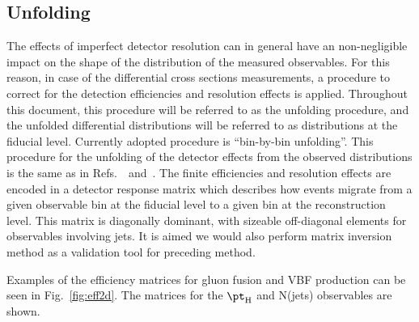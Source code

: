 \subsection{Unfolding}
The effects of imperfect detector resolution can in general have an non-negligible impact on the shape of the distribution of the measured observables. For this reason, in case of the differential cross sections measurements, a procedure to correct for the detection efficiencies and
 resolution effects is applied. Throughout this document, this procedure will be referred to as
 the unfolding procedure, and the unfolded differential distributions will be referred to as distributions at the fiducial level. 
 Currently adopted procedure is ``bin-by-bin unfolding''. This procedure for the unfolding of the detector effects from the observed distributions is the same as in Refs.~\cite{CMSH4lFiducial8TeV}~and~\cite{CMSHggFiducial8TeV}. 
The finite efficiencies and resolution effects are encoded in a detector response matrix which describes how events migrate from a given observable bin at the fiducial level to a given bin at the reconstruction level. This matrix is diagonally dominant, with sizeable off-diagonal elements for observables involving jets.
 It is aimed we would also perform matrix inversion method as a validation tool for preceding method.

Examples of the efficiency matrices for gluon fusion and VBF production can be seen in Fig.~\ref{fig:eff2d}. The matrices for the $\pt_{\rm H}$ and N(jets) observables are shown.

